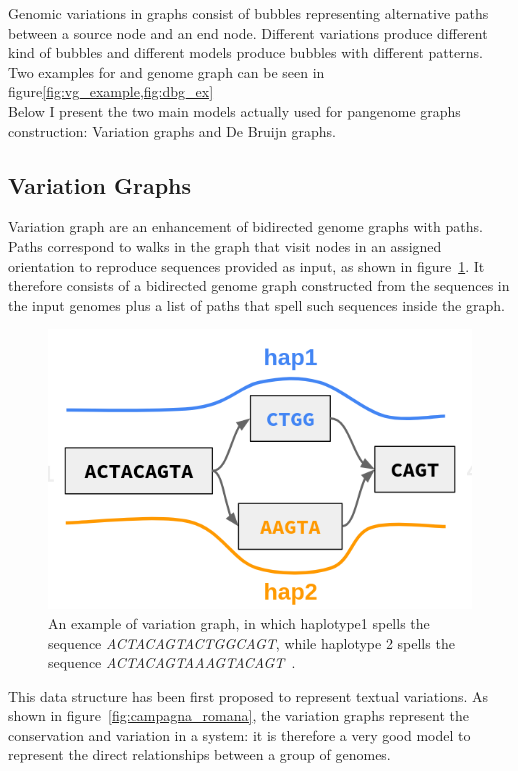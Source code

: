 Genomic variations in graphs consist of bubbles representing alternative paths between a source node and an end node. Different variations produce different kind of bubbles and different models produce bubbles with different patterns. Two examples for \dbg and genome graph can be seen in figure\ref{fig:vg_example,fig:dbg_ex}\\
Below I present the two main models actually used for pangenome graphs construction: Variation graphs and De Bruijn graphs.

\subsection{Variation Graphs}
Variation graph are an enhancement of bidirected genome graphs with paths. Paths correspond to walks in the graph that visit nodes in an assigned orientation to reproduce sequences provided as input, as shown in figure~\ref{fig:vg_example}. It therefore consists of a bidirected genome graph constructed from the sequences in the input genomes plus a list of paths that spell such sequences inside the graph.
\begin{figure}[h!]
	\centering
	\includegraphics[width=.65\linewidth]{figures/background/vg.png}
	\caption[The Variation Graph model.]{An example of variation graph, in which haplotype1 spells the sequence \emph{ACTACAGTACTGGCAGT}, while haplotype 2 spells the sequence \emph{ACTACAGTAAAGTACAGT}~\cite{garrison_pangenome}.}
	\label{fig:vg_example}
\end{figure}
This data structure has been first proposed to represent textual variations. As shown in figure~\ref{fig:campagna_romana}, the variation graphs represent the conservation and variation in a system: it is therefore a very good model to represent the direct relationships between a group of genomes.
